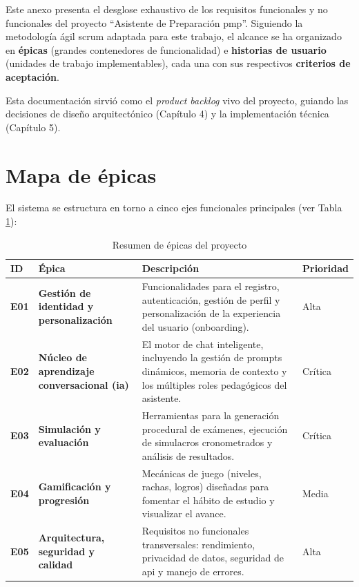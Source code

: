 Este anexo presenta el desglose exhaustivo de los requisitos funcionales y no funcionales del proyecto \enquote{Asistente de Preparación \gls{pmp}}. Siguiendo la metodología ágil \gls{scrum} adaptada para este trabajo, el alcance se ha organizado en \textbf{épicas} (grandes contenedores de funcionalidad) e \textbf{historias de usuario} (unidades de trabajo implementables), cada una con sus respectivos \textbf{criterios de aceptación}.

Esta documentación sirvió como el \textit{product backlog} vivo del proyecto, guiando las decisiones de diseño arquitectónico (Capítulo 4) y la implementación técnica (Capítulo 5).

\section{Mapa de épicas}

El sistema se estructura en torno a cinco ejes funcionales principales (ver Tabla \ref{tab:epicas}):

\begin{table}[h]
\centering
\begin{tabularx}{0.95\textwidth}{|l|p{4cm}|X|l|}
\hline
\textbf{ID} & \textbf{Épica} & \textbf{Descripción} & \textbf{Prioridad} \\
\hline
\textbf{E01} & \textbf{Gestión de identidad y personalización} & Funcionalidades para el registro, autenticación, gestión de perfil y personalización de la experiencia del usuario (onboarding). & Alta \\
\hline
\textbf{E02} & \textbf{Núcleo de aprendizaje conversacional (\gls{ia})} & El motor de chat inteligente, incluyendo la gestión de prompts dinámicos, memoria de contexto y los múltiples roles pedagógicos del asistente. & Crítica \\
\hline
\textbf{E03} & \textbf{Simulación y evaluación} & Herramientas para la generación procedural de exámenes, ejecución de simulacros cronometrados y análisis de resultados. & Crítica \\
\hline
\textbf{E04} & \textbf{Gamificación y progresión} & Mecánicas de juego (niveles, rachas, logros) diseñadas para fomentar el hábito de estudio y visualizar el avance. & Media \\
\hline
\textbf{E05} & \textbf{Arquitectura, seguridad y calidad} & Requisitos no funcionales transversales: rendimiento, privacidad de datos, seguridad de \gls{api} y manejo de errores. & Alta \\
\hline
\end{tabularx}
\caption{Resumen de épicas del proyecto}
\label{tab:epicas}
\end{table}

